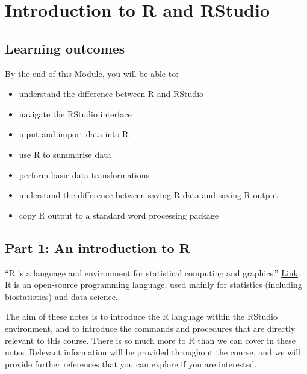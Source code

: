 \documentclass[
]{memoir}
\providecommand{\tightlist}{%
  \setlength{\itemsep}{0pt}\setlength{\parskip}{0pt}}
\begin{document}
\hypertarget{introduction-to-r-and-rstudio}{%
\chapter{Introduction to R and RStudio}\label{introduction-to-r-and-rstudio}}

\hypertarget{learning-outcomes}{%
\section*{Learning outcomes}\label{learning-outcomes}}

By the end of this Module, you will be able to:

\begin{itemize}
\tightlist
\item
  understand the difference between R and RStudio
\item
  navigate the RStudio interface
\item
  input and import data into R
\item
  use R to summarise data
\item
  perform basic data transformations
\item
  understand the difference between saving R data and saving R output
\item
  copy R output to a standard word processing package
\end{itemize}

\hypertarget{part-1-an-introduction-to-r}{%
\section*{Part 1: An introduction to R}\label{part-1-an-introduction-to-r}}

``R is a language and environment for statistical computing and graphics.'' \href{https://www.r-project.org/about.html}{Link}. It is an open-source programming language, used mainly for statistics (including biostatistics) and data science.

The aim of these notes is to introduce the R language within the RStudio environment, and to introduce the commands and procedures that are directly relevant to this course. There is so much more to R than we can cover in these notes. Relevant information will be provided throughout the course, and we will provide further references that you can explore if you are interested.
\end{document}

